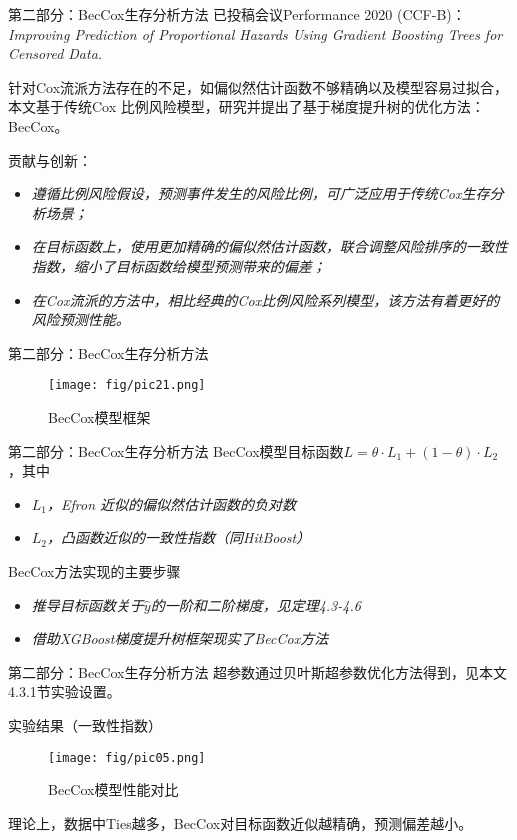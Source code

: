 \documentclass[10pt]{beamer}
\begin{document}
\begin{frame}{第二部分：BecCox生存分析方法}
  已投稿会议Performance 2020 (CCF-B)：\textit{Improving Prediction of Proportional Hazards Using Gradient Boosting Trees for Censored Data.}

  针对Cox流派方法存在的不足，如偏似然估计函数不够精确以及模型容易过拟合，本文基于传统Cox 比例风险模型，研究并提出了基于梯度提升树的优化方法：BecCox。

  贡献与创新：
  \begin{itemize}
    \item \textit{遵循比例风险假设，预测事件发生的风险比例，可广泛应用于传统Cox生存分析场景；}
    \item \textit{在目标函数上，使用更加精确的偏似然估计函数，联合调整风险排序的一致性指数，缩小了目标函数给模型预测带来的偏差；}
    \item \textit{在Cox流派的方法中，相比经典的Cox比例风险系列模型，该方法有着更好的风险预测性能。}
  \end{itemize}
  
\end{frame}

\begin{frame}{第二部分：BecCox生存分析方法}
  \begin{figure}[H]
    \centering
    \texttt{[image: fig/pic21.png]}
    \caption{BecCox模型框架}
  \end{figure}
  
\end{frame}

\begin{frame}{第二部分：BecCox生存分析方法}
  BecCox模型目标函数$L=\theta \cdot L_1 + (1-\theta) \cdot L_2$，其中
  \begin{itemize}
    \item \textit{$L_1$，Efron 近似的偏似然估计函数的负对数}
    \item \textit{$L_2$，凸函数近似的一致性指数（同HitBoost）}
  \end{itemize}

  BecCox方法实现的主要步骤
  \begin{itemize}
    \item \textit{推导目标函数关于$\hat{y}$的一阶和二阶梯度，见定理4.3-4.6}
    \item \textit{借助XGBoost梯度提升树框架现实了BecCox方法}
  \end{itemize}
\end{frame}

\begin{frame}{第二部分：BecCox生存分析方法}
  超参数通过贝叶斯超参数优化方法得到，见本文4.3.1节实验设置。


  实验结果（一致性指数）
  \begin{figure}[H]
    \centering
    \texttt{[image: fig/pic05.png]}
    \caption{BecCox模型性能对比}
  \end{figure}

  理论上，数据中Ties越多，BecCox对目标函数近似越精确，预测偏差越小。
\end{frame}
\end{document}
